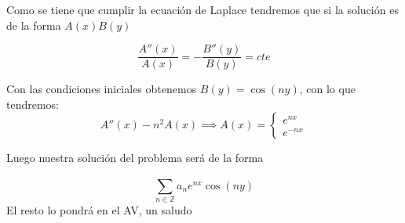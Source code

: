 \documentclass[openany]{book}
\begin{document}
\begin{exercise}
$  $


\begin{center}
  
\end{center}


Como se tiene que cumplir la ecuación de Laplace tendremos que si la solución es de la forma $ A(x)B(y) $


$$ \dfrac{A''(x)}{A(x)} = -\dfrac{B''(y)}{B(y)} = cte $$

Con las condiciones iniciales obtenemos $ B(y) = \cos(ny) $, con lo que tendremos:
$$ A''(x) -n^2A(x) \implies A(x) = \left\{
\begin{array}{l}
  e^{nx}\\ 
  e^{-nx}

\end{array}
\right. $$

Luego nuestra solución del problema será de la forma 

$$ \sum\limits_{n \in \mathbb{Z}}^{} a_n e^{nx}\cos(ny) $$
El resto lo pondrá en el AV, un saludo

\end{exercise}
\end{document}
